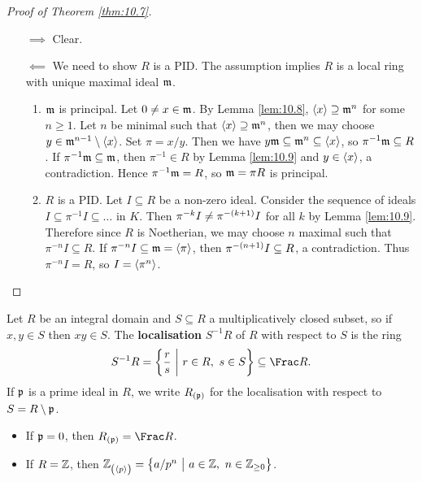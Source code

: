 \begin{proof}[Proof of Theorem \ref{thm:10.7}]
\hfill
\begin{itemize}
\item[$ \implies $] Clear.
\item[$ \impliedby $] We need to show $ R $ is a PID. The assumption implies $ R $ is a local ring with unique maximal ideal $ \mathfrak{m} $.
\begin{enumerate}[leftmargin=0.5in, label=Step \arabic*.]
\item $ \mathfrak{m} $ is principal. Let $ 0 \ne x \in \mathfrak{m} $. By Lemma \ref{lem:10.8}, $ \left\langle x \right\rangle \supseteq \mathfrak{m}^n $ for some $ n \ge 1 $. Let $ n $ be minimal such that $ \left\langle x \right\rangle \supseteq \mathfrak{m}^n $, then we may choose $ y \in \mathfrak{m}^{n - 1} \setminus \left\langle x \right\rangle $. Set $ \pi = x / y $. Then we have $ y\mathfrak{m} \subseteq \mathfrak{m}^n \subseteq \left\langle x \right\rangle $, so $ \pi^{-1}\mathfrak{m} \subseteq R $. If $ \pi^{-1}\mathfrak{m} \subseteq \mathfrak{m} $, then $ \pi^{-1} \in R $ by Lemma \ref{lem:10.9} and $ y \in \left\langle x \right\rangle $, a contradiction. Hence $ \pi^{-1}\mathfrak{m} = R $, so $ \mathfrak{m} = \pi R $ is principal.
\item $ R $ is a PID. Let $ I \subseteq R $ be a non-zero ideal. Consider the sequence of ideals $ I \subseteq \pi^{-1}I \subseteq \dots $ in $ K $. Then $ \pi^{-k}I \ne \pi^{-\br{k + 1}}I $ for all $ k $ by Lemma \ref{lem:10.9}. Therefore since $ R $ is Noetherian, we may choose $ n $ maximal such that $ \pi^{-n}I \subseteq R $. If $ \pi^{-n}I \subseteq \mathfrak{m} = \left\langle \pi \right\rangle $, then $ \pi^{-\br{n + 1}}I \subseteq R $, a contradiction. Thus $ \pi^{-n}I = R $, so $ I = \left\langle \pi^n \right\rangle $.
\end{enumerate}
\end{itemize}
\end{proof}


Let $ R $ be an integral domain and $ S \subseteq R $ a multiplicatively closed subset, so if $ x, y \in S $ then $ xy \in S $. The \textbf{localisation} $ S^{-1}R $ of $ R $ with respect to $ S $ is the ring
$$ S^{-1}R = \cbr{\dfrac{r}{s} \st r \in R, \ s \in S} \subseteq \Frac R. $$
If $ \mathfrak{p} $ is a prime ideal in $ R $, we write $ R_{\br{\ppp}} $ for the localisation with respect to $ S = R \setminus \mathfrak{p} $.

\pagebreak

\begin{example*}
\hfill
\begin{itemize}
\item If $ \mathfrak{p} = 0 $, then $ R_{\br{\ppp}} = \Frac R $.
\item If $ R = \mathbb{Z} $, then $ \ZZ_{\br{\abr{p}}} = \cbr{a / p^n \st a \in \ZZ, \ n \in \ZZ_{\ge 0}} $.
\end{itemize}
\end{example*}

